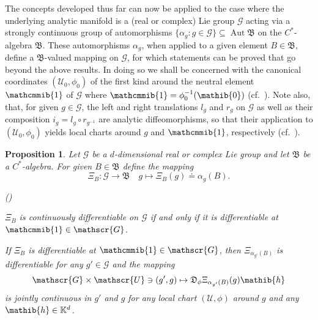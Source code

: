 \documentclass[11pt,twoside,openright]{report}
\theoremstyle{definition}
\theoremstyle{plain}
\newtheorem{Pro}[Def]{Proposition}
\theoremstyle{remark}
\theoremstyle{assumption}
\DeclareMathOperator{\Aut}{Aut}
\newcommand{\bset}[1]{\bigl\{ #1 \bigr\}}
\newcommand{\Kbb}{\mathbb{K}}
\newcommand{\Bfrak}{\mathfrak{B}}
\newcommand{\Dfrak}{\mathfrak{D}}
\newcommand{\zeroib}{\mathib{0}}
\newcommand{\hib}{\mathib{h}}
\newcommand{\Gscr}{\mathscr{G}}
\newcommand{\Uscr}{\mathscr{U}}
\newcommand{\neutral}{\mathcmmib{1}}
\newcounter{propitem}
\newenvironment{proplist}{\begin{list}{(\roman{propitem})}%
  {\usecounter{propitem} \setlength{\topsep}{0ex}%
   \setlength{\parsep}{0.2ex} \setlength{\itemsep}{0.4ex}%
   \setlength{\leftmargin}{0em} \setlength{\itemindent}{0.5em}%
   }}{\end{list}}
\begin{document}
The concepts developed thus far can now be applied to the case where
the underlying analytic manifold is a (real or complex) Lie group
$\Gscr$ acting via a strongly continuous group of automorphisms
$\bset{\alpha_g : g \in \Gscr} \subseteq \Aut \Bfrak$ on the
$C^*$-algebra $\Bfrak$. These automorphisms $\alpha_g$, when applied
to a given element $B \in \Bfrak$, define a $\Bfrak$-valued mapping on
$\Gscr$, for which statements can be proved that go beyond the above
results. In doing so we shall be concerned with the canonical
coordinates $( \Uscr_0 , \phi_0 )$ of the first kind around the
neutral element $\neutral$ of $\Gscr$ where $\neutral = \phi_0^{-1} (
\zeroib )$ (cf.~\cite[Section~2.10]{varadarajan:1984}). Note also,
that, for given $g \in \Gscr$, the left and right translations $l_g$
and $r_g$ on $\Gscr$ as well as their composition $i_g = l_g \circ
r_{g^{-1}}$ are analytic diffeomorphisms, so that their application to
$( \Uscr_0 , \phi_0 )$ yields local charts around $g$ and $\neutral$,
respectively (cf.~\cite[Section~2.1]{varadarajan:1984}).
\begin{Pro}
  \label{Pro-G-differentiability}
  Let $\Gscr$ be a $d$-dimensional real or complex Lie group and let
  $\Bfrak$ be a $C^*$-algebra. For given $B \in \Bfrak$ define the
  mapping 
  \begin{equation*}
    \Xi_B : \Gscr \rightarrow \Bfrak \quad g \mapsto \Xi_B ( g )
    \doteq \alpha_g ( B ) \text{.}
  \end{equation*}
  \begin{proplist}
  \item $\Xi_B$ is continuously differentiable on $\Gscr$ if and only
    if it is differentiable at $\neutral \in \Gscr$.
  \item If $\Xi_B$ is differentiable at $\neutral \in \Gscr$, then
    $\Xi_{\alpha_{g'} ( B )}$ is differentiable for any $g' \in \Gscr$
    and the mapping
    \begin{equation*}
      \Gscr \times \Uscr \ni ( g' , g ) \mapsto \Dfrak_\phi
      \Xi_{\alpha_{g'} ( B )} ( g ) \hib
    \end{equation*}
    is jointly continuous in $g'$ and $g$ for any local chart $( \Uscr
    , \phi )$ around $g$ and any $\hib \in \Kbb^d$.
  \end{proplist}
\end{Pro}
\end{document}
